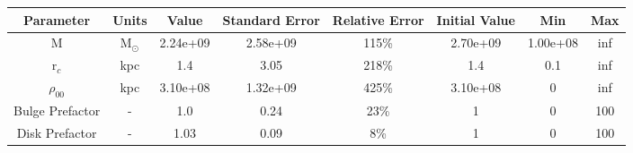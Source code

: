 \begin{tabular}[c]{| c | c | c | c | c | c | c | c |} 
\hline 
    \textbf{Parameter} & \textbf{Units} & \textbf{Value} & \textbf{Standard Error} & \textbf{Relative Error} & \textbf{Initial Value} & \textbf{Min} & \textbf{Max} \\ \hline 
    M & M$_\odot$ & 2.24e+09 & 2.58e+09 & 115\% & 2.70e+09 & 1.00e+08 & inf \\ \hline 
    r$_c$ & kpc & 1.4 & 3.05 & 218\% & 1.4 & 0.1 & inf \\ \hline 
    $\rho_{00}$ & kpc & 3.10e+08 & 1.32e+09 & 425\% & 3.10e+08 & 0 & inf \\ \hline 
    Bulge Prefactor & - & 1.0 & 0.24 & 23\% & 1 & 0 & 100 \\ \hline 
    Disk Prefactor & - & 1.03 & 0.09 & 8\% & 1 & 0 & 100 \\ \hline 
\end{tabular} 
